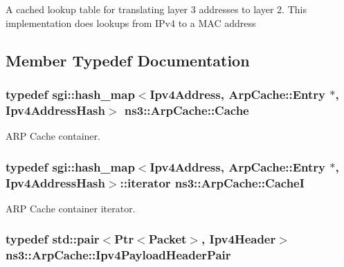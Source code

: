 A cached lookup table for translating layer 3 addresses to layer 2. This implementation does lookups from I\+Pv4 to a M\+AC address 

\subsection{Member Typedef Documentation}
\subsubsection[{\texorpdfstring{Cache}{Cache}}]{\setlength{\rightskip}{0pt plus 5cm}typedef sgi\+::hash\+\_\+map$<${\bf Ipv4\+Address}, {\bf Arp\+Cache\+::\+Entry} $\ast$, {\bf Ipv4\+Address\+Hash}$>$ {\bf ns3\+::\+Arp\+Cache\+::\+Cache}\hspace{0.3cm}{\ttfamily [private]}}\hypertarget{classns3_1_1ArpCache_a0d745162ea670b114dd1a313c69c4aab}{}\label{classns3_1_1ArpCache_a0d745162ea670b114dd1a313c69c4aab}


A\+RP Cache container. 

\subsubsection[{\texorpdfstring{CacheI}{CacheI}}]{\setlength{\rightskip}{0pt plus 5cm}typedef sgi\+::hash\+\_\+map$<${\bf Ipv4\+Address}, {\bf Arp\+Cache\+::\+Entry} $\ast$, {\bf Ipv4\+Address\+Hash}$>$\+::iterator {\bf ns3\+::\+Arp\+Cache\+::\+CacheI}\hspace{0.3cm}{\ttfamily [private]}}\hypertarget{classns3_1_1ArpCache_a22c6fbe2d2b3b00d995ed13ec6a0c9cb}{}\label{classns3_1_1ArpCache_a22c6fbe2d2b3b00d995ed13ec6a0c9cb}


A\+RP Cache container iterator. 

\subsubsection[{\texorpdfstring{Ipv4\+Payload\+Header\+Pair}{Ipv4PayloadHeaderPair}}]{\setlength{\rightskip}{0pt plus 5cm}typedef std\+::pair$<${\bf Ptr}$<${\bf Packet}$>$, {\bf Ipv4\+Header}$>$ {\bf ns3\+::\+Arp\+Cache\+::\+Ipv4\+Payload\+Header\+Pair}}\hypertarget{classns3_1_1ArpCache_ad018741a53ccc6cdb8b05fdd4873ef3d}{}\label{classns3_1_1ArpCache_ad018741a53ccc6cdb8b05fdd4873ef3d}


